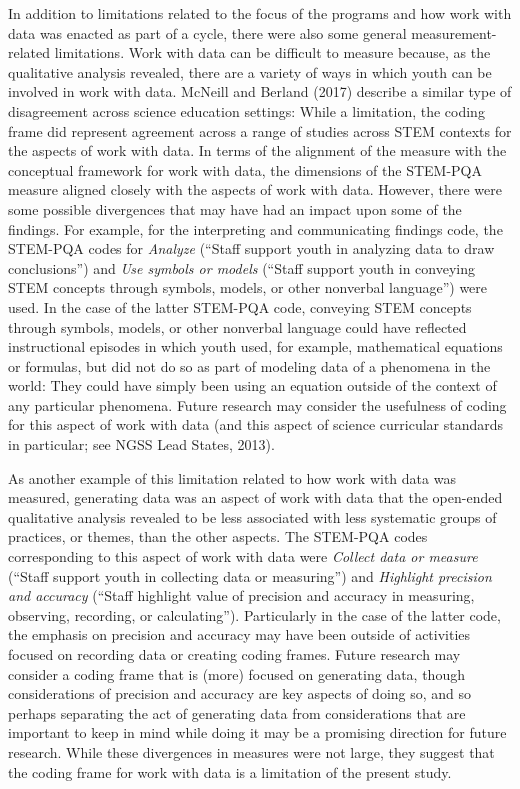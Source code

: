 \documentclass[]{book}
\theoremstyle{definition}
\theoremstyle{definition}
\theoremstyle{definition}
\theoremstyle{remark}
\begin{document}
In addition to limitations related to the focus of the programs and how
work with data was enacted as part of a cycle, there were also some
general measurement-related limitations. Work with data can be difficult
to measure because, as the qualitative analysis revealed, there are a
variety of ways in which youth can be involved in work with data.
McNeill and Berland (2017) describe a similar type of disagreement
across science education settings: While a limitation, the coding frame
did represent agreement across a range of studies across STEM contexts
for the aspects of work with data. In terms of the alignment of the
measure with the conceptual framework for work with data, the dimensions
of the STEM-PQA measure aligned closely with the aspects of work with
data. However, there were some possible divergences that may have had an
impact upon some of the findings. For example, for the interpreting and
communicating findings code, the STEM-PQA codes for \emph{Analyze}
(``Staff support youth in analyzing data to draw conclusions'') and
\emph{Use symbols or models} (``Staff support youth in conveying STEM
concepts through symbols, models, or other nonverbal language'') were
used. In the case of the latter STEM-PQA code, conveying STEM concepts
through symbols, models, or other nonverbal language could have
reflected instructional episodes in which youth used, for example,
mathematical equations or formulas, but did not do so as part of
modeling data of a phenomena in the world: They could have simply been
using an equation outside of the context of any particular phenomena.
Future research may consider the usefulness of coding for this aspect of
work with data (and this aspect of science curricular standards in
particular; see NGSS Lead States, 2013).

As another example of this limitation related to how work with data was
measured, generating data was an aspect of work with data that the
open-ended qualitative analysis revealed to be less associated with less
systematic groups of practices, or themes, than the other aspects. The
STEM-PQA codes corresponding to this aspect of work with data were
\emph{Collect data or measure} (``Staff support youth in collecting data
or measuring'') and \emph{Highlight precision and accuracy} (``Staff
highlight value of precision and accuracy in measuring, observing,
recording, or calculating''). Particularly in the case of the latter
code, the emphasis on precision and accuracy may have been outside of
activities focused on recording data or creating coding frames. Future
research may consider a coding frame that is (more) focused on
generating data, though considerations of precision and accuracy are key
aspects of doing so, and so perhaps separating the act of generating
data from considerations that are important to keep in mind while doing
it may be a promising direction for future research. While these
divergences in measures were not large, they suggest that the coding
frame for work with data is a limitation of the present study.
\end{document}
